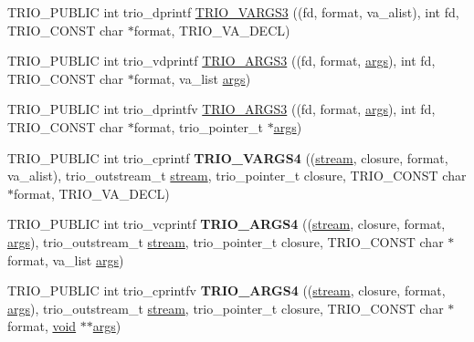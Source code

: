 \begin{DoxyCompactItemize}
\item 
T\+R\+I\+O\+\_\+\+P\+U\+B\+L\+IC int trio\+\_\+dprintf \hyperlink{group___printf_ga5ea6293443e3c6e9153736794e1aad2f}{T\+R\+I\+O\+\_\+\+V\+A\+R\+G\+S3} ((fd, format, va\+\_\+alist), int fd, T\+R\+I\+O\+\_\+\+C\+O\+N\+ST char $\ast$format, T\+R\+I\+O\+\_\+\+V\+A\+\_\+\+D\+E\+CL)
\item 
T\+R\+I\+O\+\_\+\+P\+U\+B\+L\+IC int trio\+\_\+vdprintf \hyperlink{group___printf_ga2e382fc08f3d8404bda0e5a4c065478f}{T\+R\+I\+O\+\_\+\+A\+R\+G\+S3} ((fd, format, \hyperlink{structargs}{args}), int fd, T\+R\+I\+O\+\_\+\+C\+O\+N\+ST char $\ast$format, va\+\_\+list \hyperlink{structargs}{args})
\item 
T\+R\+I\+O\+\_\+\+P\+U\+B\+L\+IC int trio\+\_\+dprintfv \hyperlink{group___printf_gadedc718262f86e06365842f0b284e9ba}{T\+R\+I\+O\+\_\+\+A\+R\+G\+S3} ((fd, format, \hyperlink{structargs}{args}), int fd, T\+R\+I\+O\+\_\+\+C\+O\+N\+ST char $\ast$format, trio\+\_\+pointer\+\_\+t $\ast$\hyperlink{structargs}{args})
\item 
\mbox{\label{group___printf_ga37e6b5278eebe8b68ec771b119acacac}} 
T\+R\+I\+O\+\_\+\+P\+U\+B\+L\+IC int trio\+\_\+cprintf {\bfseries T\+R\+I\+O\+\_\+\+V\+A\+R\+G\+S4} ((\hyperlink{structstream}{stream}, closure, format, va\+\_\+alist), trio\+\_\+outstream\+\_\+t \hyperlink{structstream}{stream}, trio\+\_\+pointer\+\_\+t closure, T\+R\+I\+O\+\_\+\+C\+O\+N\+ST char $\ast$format, T\+R\+I\+O\+\_\+\+V\+A\+\_\+\+D\+E\+CL)
\item 
\mbox{\label{group___printf_ga1b19a221acd953bfa682fae8d5bcd559}} 
T\+R\+I\+O\+\_\+\+P\+U\+B\+L\+IC int trio\+\_\+vcprintf {\bfseries T\+R\+I\+O\+\_\+\+A\+R\+G\+S4} ((\hyperlink{structstream}{stream}, closure, format, \hyperlink{structargs}{args}), trio\+\_\+outstream\+\_\+t \hyperlink{structstream}{stream}, trio\+\_\+pointer\+\_\+t closure, T\+R\+I\+O\+\_\+\+C\+O\+N\+ST char $\ast$format, va\+\_\+list \hyperlink{structargs}{args})
\item 
\mbox{\label{group___printf_ga9dfac472300b741766ea195435fefe48}} 
T\+R\+I\+O\+\_\+\+P\+U\+B\+L\+IC int trio\+\_\+cprintfv {\bfseries T\+R\+I\+O\+\_\+\+A\+R\+G\+S4} ((\hyperlink{structstream}{stream}, closure, format, \hyperlink{structargs}{args}), trio\+\_\+outstream\+\_\+t \hyperlink{structstream}{stream}, trio\+\_\+pointer\+\_\+t closure, T\+R\+I\+O\+\_\+\+C\+O\+N\+ST char $\ast$format, \hyperlink{interfacevoid}{void} $\ast$$\ast$\hyperlink{structargs}{args})
$$
\end{DoxyCompactItemize}
